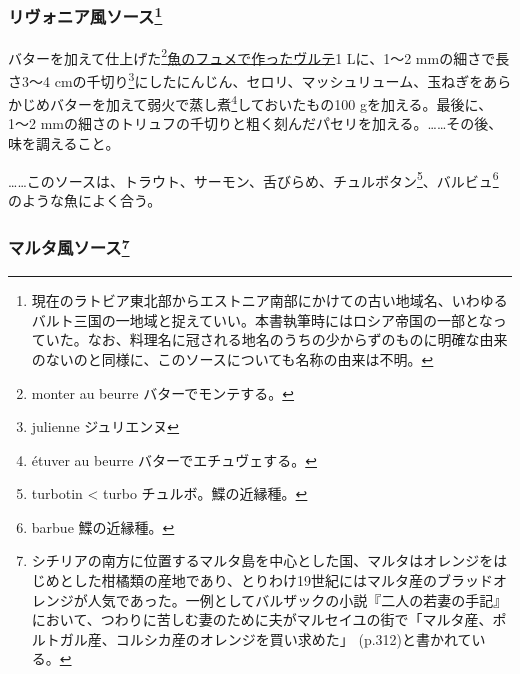 \begin{recette}
\atoaki{}

\hypertarget{sauce-livonienne}{%
\subsubsection[リヴォニア風ソース]{\texorpdfstring{リヴォニア風ソース\footnote{現在のラトビア東北部からエストニア南部にかけての古い地域名、いわゆるバルト三国の一地域と捉えていい。本書執筆時にはロシア帝国の一部となっていた。なお、料理名に冠される地名のうちの少からずのものに明確な由来のないのと同様に、このソースについても名称の由来は不明。}}{リヴォニア風ソース}}\label{sauce-livonienne}}



バターを加えて仕上げた\footnote{monter au beurre バターでモンテする。}\protect\hyperlink{veloute-de-poisson}{魚のフュメで作ったヴルテ}1
Lに、1〜2 mmの細さで長さ3〜4 cmの千切り\footnote{julienne ジュリエンヌ}にしたにんじん、セロリ、マッシュリューム、玉ねぎをあらかじめバターを加えて弱火で蒸し煮\footnote{étuver
  au beurre バターでエチュヴェする。}しておいたもの100
gを加える。最後に、1〜2
mmの細さのトリュフの千切りと粗く刻んだパセリを加える。\ldots{}\ldots{}その後、味を調えること。

\ldots{}\ldots{}このソースは、トラウト、サーモン、舌びらめ、チュルボタン\footnote{turbotin
  \textless{} turbo チュルボ。鰈の近縁種。}、バルビュ\footnote{barbue
  鰈の近縁種。}のような魚によく合う。

\atoaki{}

\hypertarget{sauce-maltaise}{%
\subsubsection[マルタ風ソース]{\texorpdfstring{マルタ風ソース\footnote{シチリアの南方に位置するマルタ島を中心とした国、マルタはオレンジをはじめとした柑橘類の産地であり、とりわけ19世紀にはマルタ産のブラッドオレンジが人気であった。一例としてバルザックの小説『二人の若妻の手記』において、つわりに苦しむ妻のために夫がマルセイユの街で「マルタ産、ポルトガル産、コルシカ産のオレンジを買い求めた」
  (p.312)と書かれている。}}{マルタ風ソース}}\label{sauce-maltaise}}



\end{recette}
